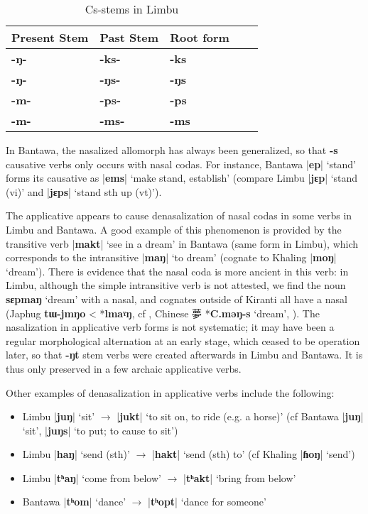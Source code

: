 \documentclass[oneside,a4paper,11pt]{article}
\newcommand{\ipa}[1]{\textbf{{\phon\mbox{#1}}}} %
\newcommand{\zh}[1]{{\cn #1}}
\newcommand{\dhatu}[2]{|\ipa{#1}| `#2'}
\begin{document}
\begin{table}[H]
\caption{Cs-stems in Limbu} \centering \label{tab:Cs.limbu}
\begin{tabular}{lllll}
\toprule
Present Stem & Past Stem & Root form \\
\midrule
\ipa{-ŋ-} & \ipa{-ks-} & \ipa{-ks} \\
\ipa{-ŋ-} & \ipa{-ŋs-} & \ipa{-ŋs} \\
\ipa{-m-} & \ipa{-ps-} & \ipa{-ps} \\
\ipa{-m-} & \ipa{-ms-} & \ipa{-ms} \\
\bottomrule
\end{tabular}
\end{table} 

In Bantawa, the nasalized allomorph has always been generalized, so that \ipa{-s} causative verbs only occurs with nasal codas. For instance, Bantawa \dhatu{ep}{stand} forms its causative as \dhatu{ems}{make stand, establish} (compare Limbu \dhatu{jɛp}{stand (vi)}  and \dhatu{jɛps}{stand sth up (vt)}).

The applicative appears to cause denasalization of nasal codas in some verbs in Limbu and Bantawa. A good example of this phenomenon is provided by the transitive verb \dhatu{makt}{see in a dream}	in Bantawa (same form in Limbu), which corresponds to the intransitive \dhatu{maŋ}{to dream} (cognate to Khaling \dhatu{moŋ}{dream}). There is evidence that the nasal coda is more ancient in this verb: in Limbu, although the simple intransitive verb is not attested, we find the noun \ipa{sɛpmaŋ} `dream' with a nasal, and cognates outside of Kiranti all have a nasal (Japhug \ipa{tɯ-jmŋo} < *\ipa{lmaˠŋ}, cf \citealt[44]{jacques04these}, Chinese \zh{夢} *\ipa{C.məŋ-s} `dream', \citealt{bs14oc}). The nasalization in applicative verb forms is not systematic; it may have been a regular morphological alternation at an early stage, which ceased to be operation later, so that \ipa{-ŋt} stem verbs were created afterwards in Limbu and Bantawa. It is thus only preserved in a few archaic applicative verbs.


Other examples of denasalization in applicative verbs include the following:

\begin{itemize}
\item Limbu \dhatu{juŋ}{sit} $\rightarrow $ \dhatu{jukt}{to sit on, to ride (e.g. a horse)} (cf Bantawa \dhatu{juŋ}{sit}, \dhatu{juŋs}{to put; to cause to sit})
\item Limbu \dhatu{haŋ}{send (sth)} $\rightarrow $ \dhatu{hakt}{send (sth) to} (cf Khaling \dhatu{ɦoŋ}{send})
\item Limbu \dhatu{tʰaŋ}{come from below} $\rightarrow $ \dhatu{tʰakt}{bring from below}
\item Bantawa \dhatu{tʰom}{dance} $\rightarrow $ \dhatu{tʰopt}{dance for someone}
\end{itemize}
 
\end{document}
